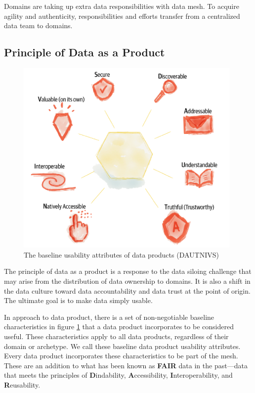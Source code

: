 \documentclass[12pt, a4paper]{book}
\begin{document}
Domains are taking up extra data responsibilities with data mesh. To acquire agility and authenticity, responsibilities and efforts transfer from a centralized data team to domains. \cite{datamesh2022ch2}

\subsection{Principle of Data as a Product}
\begin{figure}[h]
	\begin{framed}
		\centering
		\includegraphics[width=11cm]{dautnivs.png}
		\caption{The baseline usability attributes of data products (DAUTNIVS)}
		\label{dautnivs}
	\end{framed}
\end{figure}

The principle of data as a product is a response to the data siloing challenge that may arise from the distribution of data ownership to domains. It is also a shift in the data culture toward data accountability and data trust at the point of origin. The ultimate goal is to make data simply usable.

In approach to data product, there is a set of non-negotiable baseline characteristics in figure \ref{dautnivs} that a data product incorporates to be considered useful. These characteristics apply to all data products, regardless of their domain or archetype. We call these baseline data product usability attributes. Every data product incorporates these characteristics to be part of the mesh. These are an addition to what has been known as \textbf{FAIR} data in the past—data that meets the principles of \textbf{D}indability, \textbf{A}ccessibility,  \textbf{I}nteroperability, and \textbf{R}eusability. \cite{fair}
\end{document}
